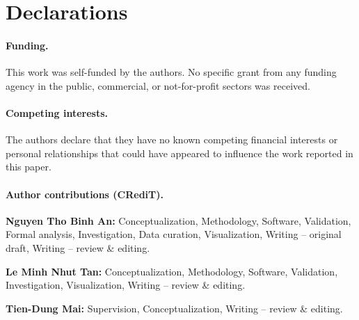 \section*{Declarations}

\paragraph{Funding.}
This work was self-funded by the authors. No specific grant from any funding agency in the public, commercial, or not-for-profit sectors was received.

\paragraph{Competing interests.}
The authors declare that they have no known competing financial interests or personal relationships that could have appeared to influence the work reported in this paper.

\begin{samepage}
\paragraph{Author contributions (CRediT).}
\textbf{Nguyen Tho Binh An:} Conceptualization, Methodology, Software, Validation, Formal analysis, Investigation, Data curation, Visualization, Writing -- original draft, Writing -- review \& editing.
\par
\end{samepage}

\begin{samepage}
\noindent
\textbf{Le Minh Nhut Tan:} Conceptualization, Methodology, Software, Validation, Investigation, Visualization, Writing -- review \& editing.
\par
\end{samepage}

\begin{samepage}
\noindent
\textbf{Tien-Dung Mai:} Supervision, Conceptualization, Writing -- review \& editing.
\par
\end{samepage}
